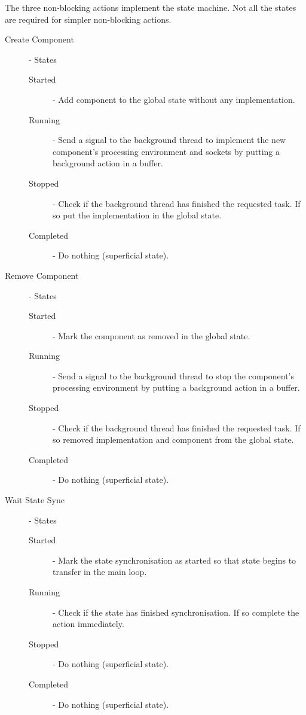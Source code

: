 The three non-blocking actions implement the state machine. Not all the states are required for simpler non-blocking actions.

\begin{description}
    \item [Create Component] - States
    \begin{description}
        \item [Started] - Add component to the global state without any implementation.
        \item [Running] - Send a signal to the background thread to implement the new component's processing environment and sockets by putting a background action in a buffer.
        \item [Stopped] - Check if the background thread has finished the requested task. If so put the implementation in the global state.
        \item [Completed] - Do nothing (superficial state).
    \end{description}

    \item[Remove Component] - States
    \begin{description}
        \item [Started] - Mark the component as removed in the global state.
        \item [Running] - Send a signal to the background thread to stop the component's processing environment by putting a background action in a buffer.
        \item [Stopped] - Check if the background thread has finished the requested task. If so removed implementation and component from the global state.
        \item [Completed] - Do nothing (superficial state).
    \end{description}

    \item[Wait State Sync] - States
    \begin{description}
        \item [Started] - Mark the state synchronisation as started so that state begins to transfer in the main loop.
        \item [Running] - Check if the state has finished synchronisation. If so complete the action immediately.
        \item [Stopped] - Do nothing (superficial state).
        \item [Completed] - Do nothing (superficial state).
    \end{description}
\end{description}

